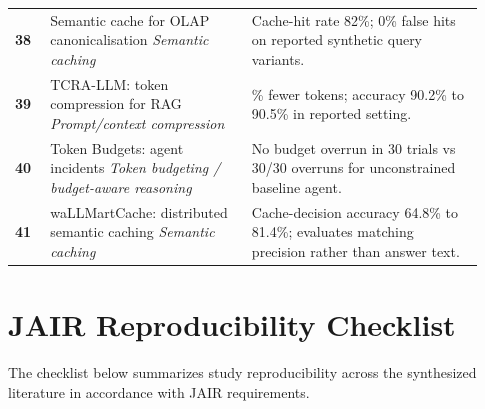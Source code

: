 \IfFileExists{jair.cls}{\documentclass{jair}}{\documentclass[manuscript,nonacm,screen]{acmart}}
\begin{document}
{\begin{longtable}{@{}>{\RaggedRight\arraybackslash}p{0.07\linewidth} >{\RaggedRight\arraybackslash}p{0.40\linewidth} >{\RaggedRight\arraybackslash}p{0.46\linewidth}@{}}
\textbf{38} & Semantic cache for OLAP canonicalisation \cite{S38}\newline\emph{Semantic caching} & Cache-hit rate 82\%; 0\% false hits on reported synthetic query variants. \\
\textbf{39} & TCRA-LLM: token compression for RAG \cite{S39}\newline\emph{Prompt/context compression} & 65\% fewer tokens; accuracy 90.2\% to 90.5\% in reported setting. \\
\textbf{40} & Token Budgets: agent incidents \cite{S40}\newline\emph{Token budgeting / budget-aware reasoning} & No budget overrun in 30 trials vs 30/30 overruns for unconstrained baseline agent. \\
\textbf{41} & waLLMartCache: distributed semantic caching \cite{S41}\newline\emph{Semantic caching} & Cache-decision accuracy 64.8\% to 81.4\%; evaluates matching precision rather than answer text. \\
\end{longtable}
}

\clearpage
\section{JAIR Reproducibility Checklist}

The checklist below summarizes study reproducibility across the synthesized literature in accordance with JAIR requirements.
\end{document}
